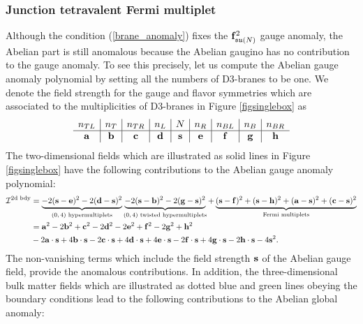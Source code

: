 \documentclass{article}
\numberwithin{equation}{section}
\begin{document}
\subsubsection{Junction tetravalent Fermi multiplet}
\label{sec_quadrant}
Although the condition (\ref{brane_anomaly}) fixes the 
${\bf f}_{\mathfrak{su}(N)}^{2}$ gauge anomaly, 
the Abelian part is still anomalous 
because the Abelian gaugino has no contribution to the gauge anomaly. 
To see this precisely, 
let us compute the Abelian gauge anomaly polynomial by setting all the numbers of D3-branes to be one. 
We denote the field strength for the gauge and flavor symmetries which 
are associated to the multiplicities of D3-branes in Figure \ref{figsinglebox} as 
\begin{align}
\label{f_u1}
\begin{array}{c|c|c|c|c|c|c|c|c}
n_{TL}&n_{T}&n_{TR}&n_{L}&N&n_{R}&n_{BL}&n_{B}&n_{BR}\\ \hline 
\bf{a}&\bf{b}&\bf{c}&\bf{d}&\bf{s}&\bf{e}&\bf{f}&\bf{g}&\bf{h} \\
\end{array}
\end{align}
The two-dimensional fields which are illustrated as solid lines in Figure \ref{figsinglebox} have the following contributions to 
the Abelian gauge anomaly polynomial:
\begin{align}
\label{gauge_AN}
\mathcal{I}^{\textrm{2d bdy}}&=
\underbrace{
-2({\bf s}-{\bf e})^{2}
-2({\bf d}-{\bf s})^{2}
}_{\textrm{$(0,4)$ hypermultiplets}}
\underbrace{
-2({\bf s}-{\bf b})^{2}
-2({\bf g}-{\bf s})^{2}
}_{\textrm{$(0,4)$ twisted hypermultiplets}}
+
\underbrace{
({\bf s}-{\bf f})^{2}
+({\bf s}-{\bf h})^{2}
+({\bf a}-{\bf s})^{2}
+({\bf c}-{\bf s})^{2}
}_{\textrm{Fermi multiplets}}
\nonumber\\
&={\bf a}^{2}
-2{\bf b}^{2}
+{\bf c}^{2}
-2{\bf d}^{2}
-2{\bf e}^{2}
+{\bf f}^{2}
-2{\bf g}^{2}
+{\bf h}^{2}
\nonumber\\
&
-2{\bf a}\cdot {\bf s}
+4{\bf b}\cdot {\bf s}
-2{\bf c}\cdot {\bf s}
+4{\bf d}\cdot {\bf s}
+4{\bf e}\cdot {\bf s}
-2{\bf f}\cdot {\bf s}
+4{\bf g}\cdot {\bf s}
-2{\bf h}\cdot {\bf s}
-4{\bf s}^{2}. 
\end{align}
The non-vanishing terms which include the field strength ${\bf s}$ of the Abelian gauge field, 
provide the anomalous contributions. 
In addition, 
the three-dimensional bulk matter fields 
which are illustrated as dotted blue and green lines 
obeying the boundary conditions lead to the following contributions 
to the Abelian global anomaly:
\end{document}
